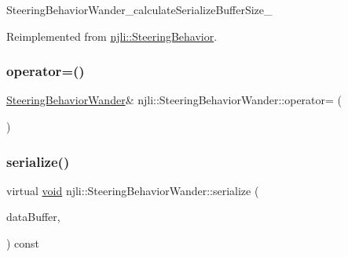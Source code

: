 \begin{DoxyCodeInclude}
\end{DoxyCodeInclude}
Steering\+Behavior\+Wander\+\_\+calculate\+Serialize\+Buffer\+Size\+\_\+ 

Reimplemented from \mbox{\hyperlink{classnjli_1_1_steering_behavior_acd7af46e42a8a3fc1208a47f50836ac8}{njli\+::\+Steering\+Behavior}}.

\mbox{\label{classnjli_1_1_steering_behavior_wander_a0b02a386b0acaa1e2af9fdefc149cf4d}} 
\subsubsection{\texorpdfstring{operator=()}{operator=()}}
{\footnotesize\ttfamily \mbox{\hyperlink{classnjli_1_1_steering_behavior_wander}{Steering\+Behavior\+Wander}}\& njli\+::\+Steering\+Behavior\+Wander\+::operator= (\begin{DoxyParamCaption}\item[{const \mbox{\hyperlink{classnjli_1_1_steering_behavior_wander}{Steering\+Behavior\+Wander}} \&}]{ }\end{DoxyParamCaption})\hspace{0.3cm}{\ttfamily [protected]}}

\mbox{\label{classnjli_1_1_steering_behavior_wander_af095b146581b167cfec14ef42bd2a32a}} 
\subsubsection{\texorpdfstring{serialize()}{serialize()}}
{\footnotesize\ttfamily virtual \mbox{\hyperlink{_thread_8h_af1e856da2e658414cb2456cb6f7ebc66}{void}} njli\+::\+Steering\+Behavior\+Wander\+::serialize (\begin{DoxyParamCaption}\item[{\mbox{\hyperlink{_thread_8h_af1e856da2e658414cb2456cb6f7ebc66}{void}} $\ast$}]{data\+Buffer,  }\item[{bt\+Serializer $\ast$}]{ }\end{DoxyParamCaption}) const\hspace{0.3cm}{\ttfamily [virtual]}}



